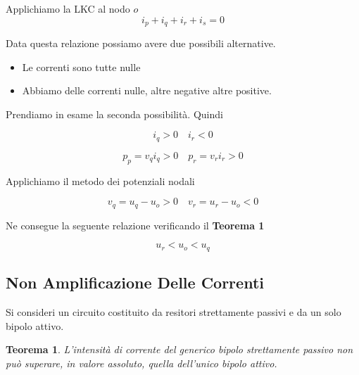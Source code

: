 \documentclass[a4paper]{report}
\newtheorem{definizione}{Teorema}
\begin{document}
Applichiamo la LKC al nodo $o$
\[
i_p+i_q+i_r+i_s=0
\]

Data questa relazione possiamo avere due possibili alternative.

\begin{itemize}
\item Le correnti sono tutte nulle
\item Abbiamo delle correnti nulle, altre negative altre positive.
\end{itemize}

Prendiamo in esame la seconda possibilit\`a. Quindi

\[
i_q>0 \quad i_r<0
\]

\[
p_p=v_qi_q>0 \quad p_r=v_ri_r>0
\]

Applichiamo il metodo dei potenziali nodali

\[
v_q=u_q-u_o>0 \quad v_r=u_r-u_o<0
\]

Ne consegue la seguente relazione verificando il {\bf Teorema 1}

\[
u_r<u_o<u_q
\]

\subsection{Non Amplificazione Delle Correnti}
Si consideri un circuito costituito da resitori strettamente passivi e
da un solo bipolo attivo.
\begin{definizione}
  L'intensit\`a di corrente del generico bipolo strettamente passivo
  non pu\`o superare, in valore assoluto, quella dell'unico bipolo attivo.
\end{definizione}
\end{document}
